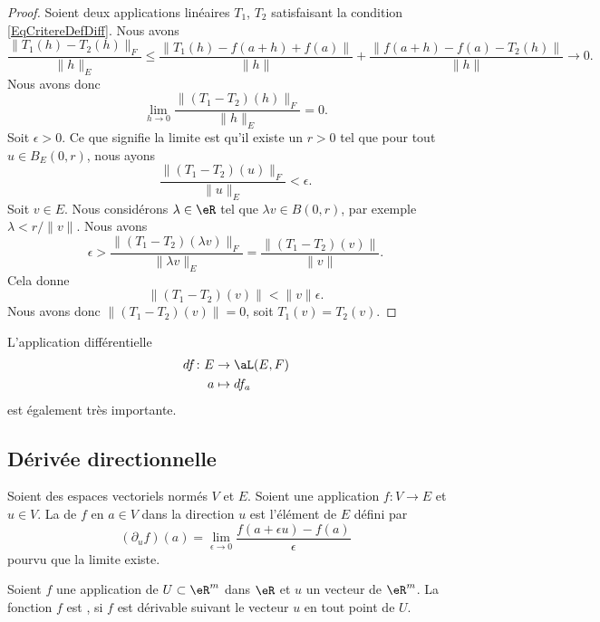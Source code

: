 \begin{proof}
	Soient deux applications linéaires \( T_1\), \( T_2\) satisfaisant la condition \eqref{EqCritereDefDiff}. Nous avons
	\begin{equation}
		\frac{ \| T_1(h)-T_2(h) \|_F }{ \| h \|_E }\leq \frac{ \| T_1(h)-f(a+h)+f(a) \| }{ \| h \| }+\frac{ \| f(a+h)-f(a)-T_2(h) \| }{ \| h \| }\to 0.
	\end{equation}
	Nous avons donc
	\begin{equation}
		\lim_{h\to 0} \frac{ \| (T_1-T_2)(h) \|_F }{ \| h \|_E }=0.
	\end{equation}
	Soit \( \epsilon>0\). Ce que signifie la limite est qu'il existe un \( r>0\) tel que pour tout \( u\in B_E(0,r)\), nous ayons
	\begin{equation}
		\frac{ \| (T_1-T_2)(u) \|_F }{ \| u \|_E }<\epsilon.
	\end{equation}
	Soit \( v\in E\). Nous considérons \( \lambda\in\eR\) tel que \( \lambda v\in B(0,r)\), par exemple \( \lambda<r/\| v \|\). Nous avons
	\begin{equation}
		\epsilon>\frac{ \| (T_1-T_2)(\lambda v) \|_F }{ \| \lambda v \|_E }=\frac{ \| (T_1-T_2)(v) \| }{ \| v \| }.
	\end{equation}
	Cela donne
	\begin{equation}
		\| (T_1-T_2)(v) \|<\| v \|\epsilon.
	\end{equation}
	Nous avons donc \( \| (T_1-T_2)(v) \|=0\), soit \( T_1(v)=T_2(v)\).
\end{proof}

L'application différentielle
\begin{equation}
	\begin{aligned}
		df\colon E & \to \aL(E,F) \\
		a          & \mapsto df_a
	\end{aligned}
\end{equation}
est également très importante.

\subsection{Dérivée directionnelle}

\begin{definition}      \label{DEFooCATTooTPLtpR}
	Soient des espaces vectoriels normés \( V\) et \( E\). Soient une application \(f \colon V\to E  \) et \( u\in V\). La  de \( f\) en \( a\in V\) dans la direction \( u\) est l'élément de \( E\) défini par
	\begin{equation}
		(\partial_uf)(a)=\lim_{\epsilon\to 0}\frac{ f(a+\epsilon u)-f(a) }{ \epsilon }
	\end{equation}
	pourvu que la limite existe.

	Soient \( f\) une application de \( U\subset\eR^m\) dans \( \eR\) et \( u\) un vecteur de \( \eR^m\). La fonction \( f\) est , si \( f\) est dérivable  suivant le vecteur \( u\) en tout point de \( U\).
\end{definition}

